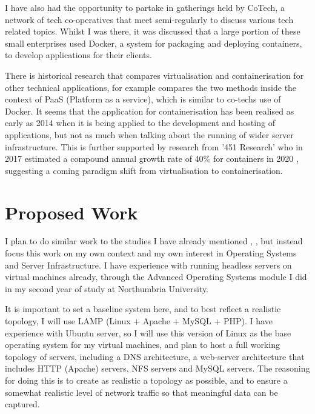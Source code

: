 I have also had the opportunity to partake in gatherings held by CoTech, a network of tech co-operatives that meet semi-regularly to discuss various tech related topics. Whilst I was there, it was discussed that a large portion of these small enterprises used Docker, a system for packaging and deploying containers, to develop applications for their clients.

There is historical research that compares virtualisation and containerisation for other technical applications, for example \citep{dua14} compares the two methods inside the context of PaaS (Platform as a service), which is similar to co-techs use of Docker. It seems that the application for containerisation has been realised as early as 2014 when it is being applied to the development and hosting of applications, but not as much when talking about the running of wider server infrastructure. This is further supported by research from '451 Research' who in 2017 estimated a compound annual growth rate of 40\% for containers in 2020 \citep{451}, suggesting a coming paradigm shift from virtualisation to containerisation.

\section{Proposed Work}
\label{proposed}
I plan to do similar work to the studies I have already mentioned \citep{joy15}, \citep{dua14}, but instead focus this work on my own context and my own interest in Operating Systems and Server Infrastructure. I have experience with running headless servers on virtual machines already, through the Advanced Operating Systems module I did in my second year of study at Northumbria University. 

It is important to set a baseline system here, and to best reflect a realistic topology, I will use LAMP (Linux + Apache + MySQL + PHP). I have experience with Ubuntu server, so I will use this version of Linux as the base operating system for my virtual machines, and plan to host a full working topology of servers, including a DNS architecture, a web-server architecture that includes HTTP (Apache) servers, NFS servers and MySQL servers. The reasoning for doing this is to create as realistic a topology as possible, and to ensure a somewhat realistic level of network traffic so that meaningful data can be captured.

